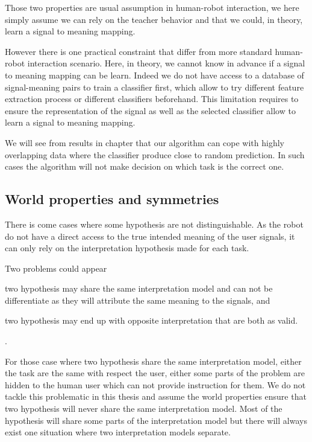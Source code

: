 Those two properties are usual assumption in human-robot interaction, we here simply assume we can rely on the teacher behavior and that we could, in theory, learn a signal to meaning mapping.

However there is one practical constraint that differ from more standard human-robot interaction scenario. Here, in theory, we cannot know in advance if a signal to meaning mapping can be learn. Indeed we do not have access to a database of signal-meaning pairs to train a classifier first, which allow to try different feature extraction process or different classifiers beforehand. This limitation requires to ensure the representation of the signal as well as the selected classifier allow to learn a signal to meaning mapping. 

We will see from results in chapter  that our algorithm can cope with highly overlapping data where the classifier produce close to random prediction. In such cases the algorithm will not make decision on which task is the correct one.

\subsection{World properties and symmetries}

There is come cases where some hypothesis are not distinguishable. As the robot do not have a direct access to the true intended meaning of the user signals, it can only rely on the interpretation hypothesis made for each task.

Two problems could appear \begin{inparaenum}[a)] \item two hypothesis may share the same interpretation model and can not be differentiate as they will attribute the same meaning to the signals, and \item two hypothesis may end up with opposite interpretation that are both as valid. \end{inparaenum}.

For those case where two hypothesis share the same interpretation model, either the task are the same with respect the user, either some parts of the problem are hidden to the human user which can not provide instruction for them. We do not tackle this problematic in this thesis and assume the world properties ensure that two hypothesis will never share the same interpretation model. Most of the hypothesis will share some parts of the interpretation model but there will always exist one situation where two interpretation models separate.

